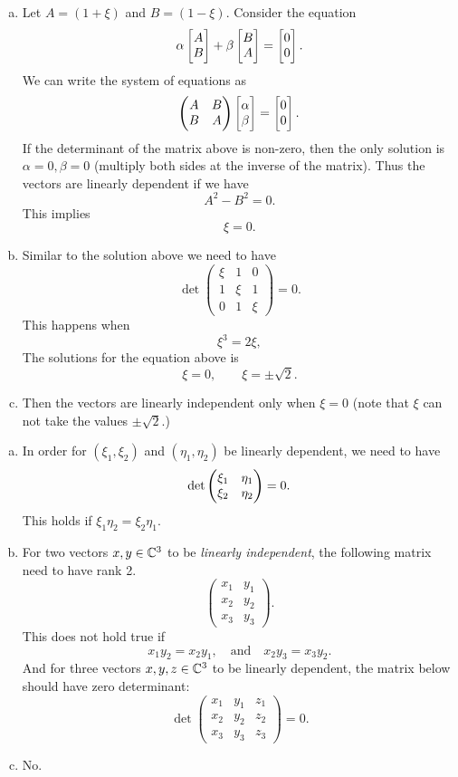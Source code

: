 \begin{problem}
	\begin{solution}
		\begin{enumerate}[(a)]
			\item Let $ A = (1+\xi) $ and $ B = (1-\xi) $. Consider the equation
			\[ \alpha \begin{bmatrix} A \\ B \end{bmatrix} + \beta\begin{bmatrix} B \\ A \end{bmatrix} = \begin{bmatrix} 0 \\ 0 \end{bmatrix}. \]
			We can write the system of equations as
			\[ \begin{pmatrix} A & B \\ B & A \end{pmatrix}\begin{bmatrix} \alpha \\ \beta \end{bmatrix} = \begin{bmatrix} 0 \\ 0 \end{bmatrix}. \]
			If the determinant of the matrix above is non-zero, then the only solution is $ \alpha = 0,\beta = 0 $ (multiply both sides at the inverse of the matrix). Thus the vectors are linearly dependent if we have
			\[ A^2 - B^2 = 0. \]
			This implies
			\[ \xi = 0. \]
			
			\item Similar to the solution above we need to have
			\[ \det \begin{pmatrix}
				\xi & 1 & 0 \\
				1 & \xi & 1 \\ 
				0 & 1 & \xi
			\end{pmatrix} = 0. \]
			This happens when
			\[ \xi^3  = 2\xi, \]
			The solutions for the equation above is
			\[ \xi = 0, \qquad \xi = \pm\sqrt{2}. \]
			
			\item Then the vectors are linearly independent only when $ \xi = 0 $ (note that $ \xi $ can not take the values $ \pm \sqrt{2} $.)
		\end{enumerate}
	\end{solution}
\end{problem}

\begin{problem}
	\begin{solution}
		\begin{enumerate}[(a)]
			\item In order for $ (\xi_1,\xi_2) $ and $ (\eta_1,\eta_2) $ be linearly dependent, we need to have
			\[ \det\begin{pmatrix} \xi_1 & \eta_1 \\ \xi_2 & \eta_2 \end{pmatrix} = 0. \]
			This holds if $\xi_1\eta_2 = \xi_2\eta_1 $.
			
			\item For two vectors $ x,y \in \mathbb{C}^3 $ to be \emph{linearly independent}, the following matrix need to have rank 2.
			\[ \begin{pmatrix}
				x_1 & y_1 \\
				x_2 & y_2 \\
				x_3 & y_3
			\end{pmatrix}. \]
			This does not hold true if
			\[ x_1y_2 = x_2y_1, \quad \text{and} \quad x_2y_3 = x_3y_2. \]
			And for three vectors $ x,y,z\in \mathbb{C}^3 $ to be linearly dependent, the matrix below should have zero determinant:
			\[ \det \begin{pmatrix}
				x_1 & y_1 & z_1 \\
				x_2 & y_2 & z_2 \\
				x_3 & y_3 & z_3
			\end{pmatrix} = 0. \]
			
			\item No. 
		\end{enumerate}
	\end{solution}
\end{problem}


